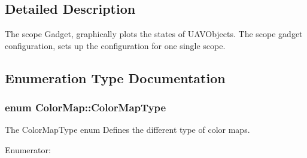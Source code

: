 \subsection{\-Detailed \-Description}
\-The scope \-Gadget, graphically plots the states of \-U\-A\-V\-Objects. \-The scope gadget configuration, sets up the configuration for one single scope. 

\subsection{\-Enumeration \-Type \-Documentation}
\hypertarget{group___scope_plugin_ga7f4f087196557757ec8061242e795031}{
\subsubsection[{\-Color\-Map\-Type}]{\setlength{\rightskip}{0pt plus 5cm}enum {\bf \-Color\-Map\-::\-Color\-Map\-Type}}}\label{group___scope_plugin_ga7f4f087196557757ec8061242e795031}


\-The \-Color\-Map\-Type enum \-Defines the different type of color maps. 

\begin{Desc}
\item[\-Enumerator\-: ]\par
\begin{description}
\item[{\em 
\hypertarget{group___scope_plugin_gga7f4f087196557757ec8061242e795031ada2d98ce081f031c9195188175d92d44}{\-S\-T\-A\-N\-D\-A\-R\-D}\label{group___scope_plugin_gga7f4f087196557757ec8061242e795031ada2d98ce081f031c9195188175d92d44}
}]\item[{\em 
\hypertarget{group___scope_plugin_gga7f4f087196557757ec8061242e795031a022cb7b62aaf4ea9c2c48375d4b187d8}{\-J\-E\-T}\label{group___scope_plugin_gga7f4f087196557757ec8061242e795031a022cb7b62aaf4ea9c2c48375d4b187d8}
}]\end{description}
\end{Desc}



